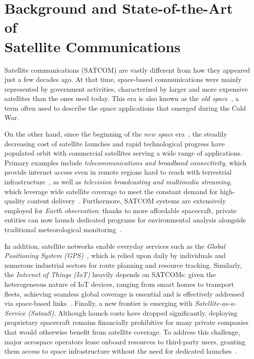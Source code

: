 \documentclass[11pt,a4paper]{report}
\begin{document}


\chapter[Background and State-of-the-Art of Satellite Communications]{Background and State-of-the-Art of \\ Satellite Communications}
Satellite communications (SATCOM) are vastly different from how they appeared just a few decades ago. 
At that time, space-based communications were mainly represented by government activities, characterized by larger and more expensive satellites than the ones used today. 
This era is also known as the \textit{old space}~\cite[p. 377]{aLotOfReferences}, a term often used to describe the space applications that emerged during the Cold War.

On the other hand, since the beginning of the \textit{new space} era~\cite[p. 377--398]{aLotOfReferences}, 
the steadily decreasing cost of satellite launches and rapid technological progress have populated orbit with commercial satellites serving a wide range of applications. 
Primary examples include \textit{telecommunications and broadband connectivity}, which provide internet access even in remote regions hard to reach with terrestrial infrastructure~\cite[p. 373--381]{aLotOfReferences}, 
as well as \textit{television broadcasting and multimedia streaming}, which leverage wide satellite coverage to meet the constant demand for high-quality content delivery~\cite[p. 373--381]{aLotOfReferences}. 
Furthermore, SATCOM systems are extensively employed for \textit{Earth observation}: thanks to more affordable spacecraft, private entities can now launch dedicated programs for environmental analysis alongside traditional meteorological monitoring~\cite[p. 372--381]{aLotOfReferences}.

In addition, satellite networks enable everyday services such as the \textit{Global Positioning System (GPS)}~\cite[p. 378--381]{aLotOfReferences}, 
which is relied upon daily by individuals and numerous industrial sectors for route planning and resource tracking. 
Similarly, the \textit{Internet of Things (IoT)} heavily depends on SATCOMs: given the heterogeneous nature of IoT devices, ranging from smart homes to transport fleets, 
achieving seamless global coverage is essential and is effectively addressed via space-based links~\cite[p. 372]{aLotOfReferences}. 
Finally, a new frontier is emerging with \textit{Satellite-as-a-Service (SataaS)}. 
Although launch costs have dropped significantly, deploying proprietary spacecraft remains financially prohibitive for many private companies that would otherwise benefit from satellite coverage. 
To address this challenge, major aerospace operators lease onboard resources to third-party users, granting them access to space infrastructure without the need for dedicated launches~\cite{SataaS}.
\end{document}
